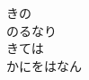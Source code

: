 \documentclass[10pt,b5j]{tarticle} %
\begin{document}
\begin{enumerate}
\begin{minipage}[c]{\blocksize}
        \vspace{\linespace}
        \item
        きの\\
        のるなり\\
        きては\\
        かにをはなん
    
    \end{minipage}
\end{enumerate} %
\end{document}
